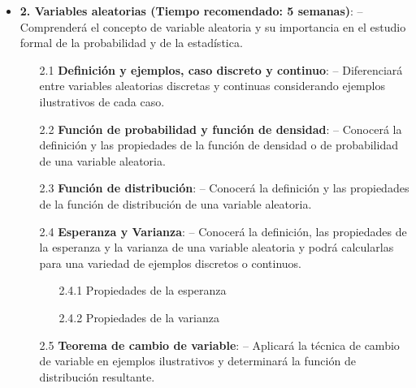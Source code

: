 \begin{itemize}
\begin{enumerate}
\item[1.4 ] \textbf{Conceptos y teoremas b\'asicos de probabilidad}: -- El/La estudiante conocer\'a la definici\'on de probabilidad condicional y de eventos independientes. -- Conocer\'a y aplicar\'a el teorema de la probabilidad total y el Teorema de Bayes en problemas espec\'ificos.

\begin{enumerate}
\item[1.4.1 ] Probabilidad condicional e independencia
\item[1.4.2 ] Teorema de probabilidad total
\item[1.4.3 ] Teorema de Bayes
\end{enumerate}
\end{enumerate}

\item \textbf{2. Variables aleatorias (Tiempo recomendado: 5 semanas)}: -- Comprender\'a el concepto de variable aleatoria y su importancia en el estudio formal de la probabilidad y de la estad\'istica.

\begin{enumerate}
\item[2.1 ] \textbf{Definici\'on y ejemplos, caso discreto y continuo}: -- Diferenciar\'a entre variables aleatorias discretas y continuas considerando ejemplos ilustrativos de cada caso.


\item[2.2 ] \textbf{Funci\'on de probabilidad y funci\'on de densidad}: -- Conocer\'a la definici\'on y las propiedades de la funci\'on de densidad o de probabilidad de una variable aleatoria.

\item[2.3 ] \textbf{Funci\'on de distribuci\'on}: -- Conocer\'a la definici\'on y las propiedades de la funci\'on de distribuci\'on de una variable aleatoria.


\item[2.4 ] \textbf{Esperanza y Varianza}: -- Conocer\'a la definici\'on, las propiedades de la esperanza y la varianza de una variable aleatoria y podr\'a calcularlas para una variedad de ejemplos discretos o continuos.

\begin{enumerate}
\item[2.4.1 ] Propiedades de la esperanza
\item[2.4.2 ] Propiedades de la varianza
\end{enumerate}

\item[2.5 ] \textbf{Teorema de cambio de variable}: -- Aplicar\'a la t\'ecnica de cambio de variable en ejemplos ilustrativos y determinar\'a la funci\'on de distribuci\'on resultante.


\end{enumerate}
\end{itemize}
